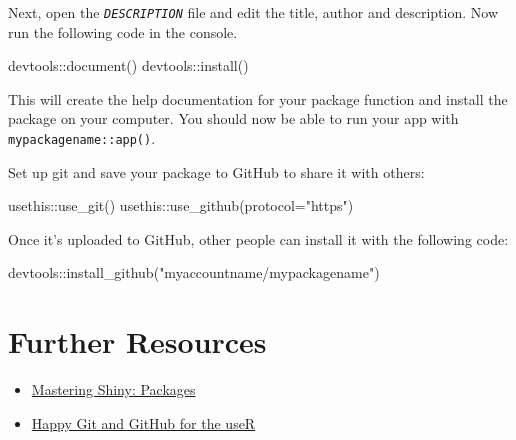\documentclass[
  oneside]{book}
\newenvironment{Shaded}{\begin{snugshade}}{\end{snugshade}}
\newcommand{\AttributeTok}[1]{\textcolor[rgb]{0.77,0.63,0.00}{#1}}
\newcommand{\FunctionTok}[1]{\textcolor[rgb]{0.00,0.00,0.00}{#1}}
\newcommand{\NormalTok}[1]{#1}
\newcommand{\SpecialCharTok}[1]{\textcolor[rgb]{0.00,0.00,0.00}{#1}}
\newcommand{\StringTok}[1]{\textcolor[rgb]{0.31,0.60,0.02}{#1}}
\providecommand{\tightlist}{%
  \setlength{\itemsep}{0pt}\setlength{\parskip}{0pt}}
\begin{document}
Next, open the \textit{\texttt{DESCRIPTION}} file and edit the title, author and description. Now run the following code in the console.

\begin{Shaded}
\begin{Highlighting}[]
\NormalTok{devtools}\SpecialCharTok{::}\FunctionTok{document}\NormalTok{()}
\NormalTok{devtools}\SpecialCharTok{::}\FunctionTok{install}\NormalTok{()}
\end{Highlighting}
\end{Shaded}

This will create the help documentation for your package function and install the package on your computer. You should now be able to run your app with \texttt{mypackagename::app}\texttt{()}.

Set up git and save your package to GitHub to share it with others:

\begin{Shaded}
\begin{Highlighting}[]
\NormalTok{usethis}\SpecialCharTok{::}\FunctionTok{use\_git}\NormalTok{()}
\NormalTok{usethis}\SpecialCharTok{::}\FunctionTok{use\_github}\NormalTok{(}\AttributeTok{protocol=}\StringTok{"https"}\NormalTok{)}
\end{Highlighting}
\end{Shaded}

Once it's uploaded to GitHub, other people can install it with the following code:

\begin{Shaded}
\begin{Highlighting}[]
\NormalTok{devtools}\SpecialCharTok{::}\FunctionTok{install\_github}\NormalTok{(}\StringTok{"myaccountname/mypackagename"}\NormalTok{)}
\end{Highlighting}
\end{Shaded}

\hypertarget{resources-sharing}{%
\section{Further Resources}\label{resources-sharing}}

\begin{itemize}
\tightlist
\item
  \href{https://mastering-shiny.org/scaling-packaging.html}{Mastering Shiny: Packages}
\item
  \href{https://happygitwithr.com/}{Happy Git and GitHub for the useR}
\end{itemize}
\end{document}
